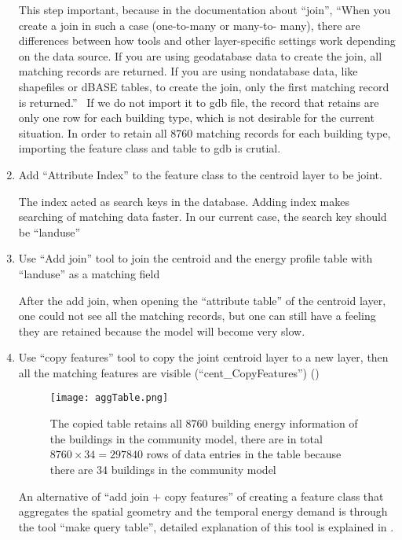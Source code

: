\begin{enumerate}[1)]
  This step important, because in the documentation about ``join'',
  ``When you create a join in such a case (one-to-many or many-to-
  many), there are differences between how tools and other
  layer-specific settings work depending on the data source. If you
  are using geodatabase data to create the join, all matching records
  are returned. If you are using nondatabase data, like shapefiles or
  dBASE tables, to create the join, only the first matching record is
  returned.''~\cite{GISjoin2014} If we do not import it to gdb file,
  the record that retains are only one row for each building type,
  which is not desirable for the current situation. In order to retain
  all 8760 matching records for each building type, importing the
  feature class and table to gdb is crutial.

\item Add ``Attribute Index'' to the feature class to the centroid
  layer to be joint.
  
  The index acted as search keys in the database. Adding index makes
  searching of matching data faster. In our current case, the search
  key should be ``landuse''
  
\item Use ``Add join'' tool to join the centroid and the energy
  profile table with ``landuse'' as a matching field

  After the add join, when opening the ``attribute table'' of the
  centroid layer, one could not see all the matching records, but one
  can still have a feeling they are retained because the model will
  become very slow. 

\item Use ``copy features'' tool to copy the joint centroid layer to a
  new layer, then all the matching features are visible
  (``cent\_CopyFeatures'') ()
  
\begin{figure}[h!]
  \centering
  \texttt{[image: aggTable.png]}
  \caption[Table with Time]{The copied table retains all 8760 building
    energy information of the buildings in the community model, there
    are in total $8760 \times 34 = 297840$ rows of data entries in the
    table because there are 34 buildings in the community model}
  \label{fig:aggTable}
\end{figure}

An alternative of ``add join $+$ copy features'' of creating a feature
class that aggregates the spatial geometry and the temporal energy
demand is through the tool ``make query table'', detailed explanation
of this tool is explained in \cite{queryTable2012}.


\end{enumerate}
